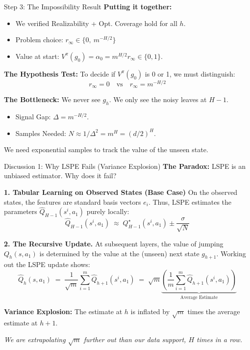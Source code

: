 \documentclass[aspectratio=169]{beamer}
\begin{document}
\begin{frame}{Step 3: The Impossibility Result}
    \textbf{Putting it together:}
    \begin{itemize}
        \item We verified Realizability + Opt. Coverage hold for all
          $h$.
        \item Problem choice: $r_\infty\in\{0,\ m^{-H/2}\}$
        \item Value at start: $V^\pi(g_0) = \alpha_0 = m^{H/2}
          r_\infty\in\{0,1\}$.
    \end{itemize}

    \vspace{0.3cm}
\pause    \textbf{The Hypothesis Test:}
    To decide if $V^\pi(g_0)$ is 0 or 1, we must distinguish:
    \[
    r_\infty = 0 \quad \text{vs} \quad r_\infty = m^{-H/2}
    \]
    
\pause    \textbf{The Bottleneck:}
    We never see $g_h$. We only see the noisy leaves at $H-1$.
    \begin{itemize}
        \item Signal Gap: $\Delta = m^{-H/2}$.
        \item Samples Needed: $N \approx 1/\Delta^2 = m^H = (d/2)^H$.
    \end{itemize}
    
    \centering
    \alert{We need exponential samples to track the value of the unseen state.}
\end{frame}

\begin{frame}{Discussion 1: Why LSPE Fails (Variance Explosion)}
    \textbf{The Paradox:}
    LSPE is an unbiased estimator. Why does it fail?
    
    \vspace{0.2cm}
    
\pause    \textbf{1. Tabular Learning on Observed States (Base Case)}
    On the observed states, the features are standard basis vectors $e_i$. Thus, LSPE estimates the parameters $\widehat{Q}_{H-1}(s^i, a_1)$ purely locally:
    \[
    \widehat{Q}_{H-1}(s^i, a_1) \;\approx\; Q^\star_{H-1}(s^i, a_1) \pm \frac{\sigma}{\sqrt{N}}
    \]
    
    \vspace{0.1cm}
    
\pause    \textbf{2. The Recursive Update.}
    At subsequent layers, the value of jumping $Q_h(s, a_1)$ is determined by the value at the (unseen) next state $g_{h+1}$. Working out the LSPE update shows:
    \[
    \widehat{Q}_h(s, a_1) \;=\; \frac{1}{\sqrt{m}} \sum_{i=1}^m \widehat{Q}_{h+1}(s^i, a_1) 
    \;=\; \sqrt{m} \underbrace{\left(\frac{1}{m} \sum_{i=1}^m \widehat{Q}_{h+1}(s^i, a_1)\right)}_{\text{Average Estimate}}
    \]
    
   \textbf{Variance Explosion:}
    The estimate at $h$ is inflated by $\sqrt{m}$ times the average estimate at $h+1$.
    
    \centering
    \small
    \emph{We are extrapolating $\sqrt{m}$ further out than our data support, $H$ times in a row.}
\end{frame}
\end{document}
